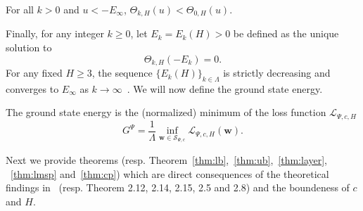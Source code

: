 \documentclass[twoside]{article}
\begin{document}
\begin{corollary}
For all $k > 0$ and $u < -E_{\infty}$, $\Theta_{k,H}(u) < \Theta_{0,H}(u)$.
\label{cor:Theta}
\end{corollary}
Finally, for any integer $k \geq 0$, let $E_k = E_k(H) > 0 $ be defined as the unique solution to 
\[\Theta_{k,H}(-E_k) = 0.
\]
For any fixed $H \geq 3$, the sequence $\{E_k(H)\}_{k\in\mathbb{\Lambda}}$ is strictly decreasing and converges to $E_{\infty}$ as $k \rightarrow \infty$~\cite{AAC2010}. We will now define the ground state energy.

\begin{definition}
The ground state energy is the (normalized) minimum of the loss function $\mathcal{L}_{\Psi,c,H}$
\[G^\Psi = \frac{1}{\Lambda}\inf_{{\bm w}\in \mathcal{S}_{\Psi,c}}\mathcal{L}_{\Psi,c,H}({\bm w}).
\]
\end{definition}
Next we provide theorems (resp. Theorem~\ref{thm:lb},~\ref{thm:ub},~\ref{thm:layer}, ~\ref{thm:lmsp} and~\ref{thm:cp}) which are direct consequences of the theoretical findings in~\cite{AAC2010} (resp. Theorem 2.12, 2.14, 2.15, 2.5 and 2.8)  and the boundeness of $c$ and $H$.  
\end{document}
